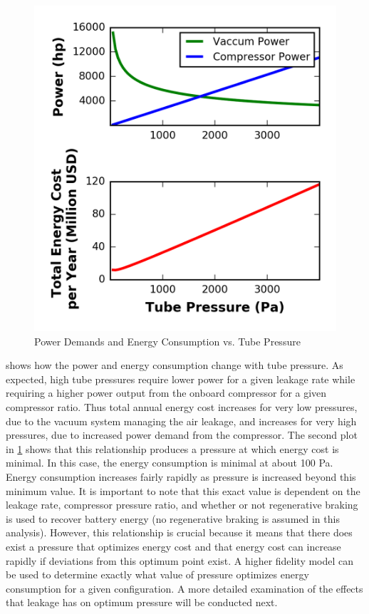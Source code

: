 \begin{figure}
	\centering
	\includegraphics{../../images/graphs/pressure_trades/pressure_vs_power.png}
	\caption{Power Demands and Energy Consumption vs. Tube Pressure}
	\label{fig:pow_demands_vs_tube_press}
\end{figure}
 shows how the power and energy consumption
change with tube pressure. As expected, high tube pressures require lower power
for a given leakage rate while requiring a higher power output from the onboard
compressor for a given compressor ratio. Thus total annual energy cost increases for very
low pressures, due to the vacuum system managing the air leakage, and increases for very high pressures,
due to increased power demand from the compressor.
The second plot in \cref{fig:pow_demands_vs_tube_press} shows that this
relationship produces a pressure at which energy cost is minimal. In this case,
the energy consumption is minimal at about 100 Pa. Energy consumption increases
fairly rapidly as pressure is increased beyond this minimum value. It is
important to note that this exact value is dependent on the leakage rate,
compressor pressure ratio, and whether or not regenerative braking is used to
recover battery energy (no regenerative braking is assumed in this analysis).
However, this relationship is crucial because it means that there does exist a
pressure that optimizes energy cost and that energy cost can increase rapidly
if deviations from this optimum point exist. A higher fidelity model can be
used to determine exactly what value of pressure optimizes energy consumption
for a given configuration. A more detailed examination of the effects that
leakage has on optimum pressure will be conducted next.

